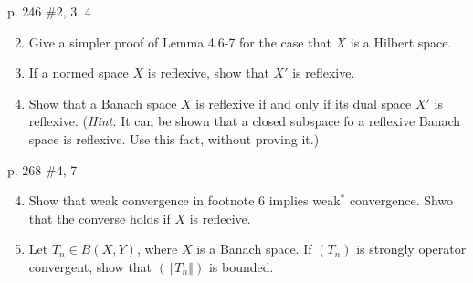 \documentclass[10pt,a4paper]{report}
\newcommand{\NORM}[1]{\,\left \Vert #1 \right \Vert}
\begin{document}
\newpage p. 246 \#2, 3, 4 
\begin{enumerate}
	\setcounter{enumi}{1}
	\item Give a simpler proof of Lemma 4.6-7 for the case that $X$ is a Hilbert space.
	\item If a normed space $X$ is reflexive, show that $X'$ is reflexive.
	\item Show that a Banach space $X$ is reflexive if and only if its dual space $X'$ is reflexive.  (\textit{Hint.}  It can be shown that a closed subspace fo a reflexive Banach space is reflexive.  Use this fact, without proving it.)
\end{enumerate}

\newpage p. 268 \#4, 7
\begin{enumerate}
	\setcounter{enumi}{3}
	\item Show that weak convergence in footnote 6 implies weak$^*$ convergence.  Shwo that the converse holds if $X$ is reflecive.
	\setcounter{enumi}{6}
	\item Let $T_n \in B(X,Y)$, where $X$ is a Banach space.  If $(T_n)$ is strongly operator convergent, show that $(\NORM{T_n})$ is bounded.

\end{enumerate}
\end{document}
